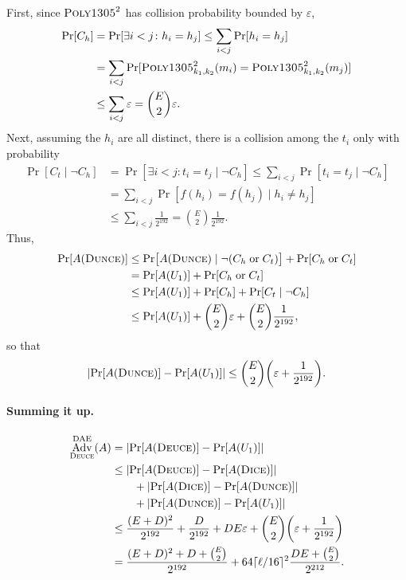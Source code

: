 \documentclass{article}
\def\operatorsc#1{{%
  \ifmmode\let\next=\operatorname\else\let\next=\relax\fi\next{\textsc{#1}}}}
\def\Poly#1/{\operatorsc{Poly#1}}
\def\DUNCE/{\operatorsc{Dunce}}
\def\DEUCE/{\operatorsc{Deuce}}
\def\DICE/{\operatorsc{Dice}}
\def\DAE{%
  \ifmmode\def\next{\operatorname{DAE}}%
    \else\def\next/{\textsc{dae}}%
  \fi\next}
\DeclareMathOperator{\Adv}{Adv}
\newcommand{\given}{\mathrel|}
\newcommand{\collisionbound}{\varepsilon}
\begin{document}
First, since $\Poly1305/^2$ has collision probability bounded by
 $\collisionbound$,
%
\begin{align*}
  \Pr[C_h]
    &= \Pr[\exists i<j\colon h_i = h_j]
     \leq \sum_{i<j} \Pr[h_i = h_j] \\
    &= \sum_{i<j}
         \Pr[\Poly1305/^2_{k_1,k_2}(m_i) = \Poly1305/^2_{k_1,k_2}(m_j)] \\
    &\leq \sum_{i<j} \collisionbound
     = \binom{E}{2} \collisionbound.
\end{align*}
%
Next, assuming the $h_i$ are all distinct, there is a collision among
 the $t_i$ only with probability
%
\begin{align*}
  \Pr[C_t \given \lnot C_h]
    &= \Pr[\exists i<j\colon t_i = t_j \given \lnot C_h]
     \leq \sum_{i<j} \Pr[t_i = t_j \given \lnot C_h] \\
    &= \sum_{i<j} \Pr[f(h_i) = f(h_j) \given h_i \ne h_j] \\
    &\leq \sum_{i<j} \frac{1}{2^{192}}
     = \binom{E}{2} \frac{1}{2^{192}}.
\end{align*}
%
Thus,
%
\begin{align*}
  \Pr[A(\DUNCE/)]
  &\leq \Pr\bigl[A(\DUNCE/) \given
            \lnot (C_h \mathrel{\text{or}} C_t)\bigr]
        + \Pr[C_h \mathrel{\text{or}} C_t] \\
  &= \Pr[A(U_1)] + \Pr[C_h \mathrel{\text{or}} C_t] \\
  &\leq \Pr[A(U_1)] + \Pr[C_h] + \Pr[C_t \given \lnot C_h] \\
  &\leq \Pr[A(U_1)] + \binom{E}{2} \collisionbound
        + \binom{E}{2} \frac{1}{2^{192}},
\end{align*}
%
 so that
\[
  \lvert\Pr[A(\DUNCE/)] - \Pr[A(U_1)]\rvert
  \leq \binom{E}{2} \biggl(\collisionbound + \frac{1}{2^{192}}\biggr).
\]

\paragraph*{Summing it up.}

\begin{align*}
  \Adv^{\DAE}_{\DEUCE/}(A)
  &= \lvert\Pr[A(\DEUCE/)] - \Pr[A(U_1)]\rvert \\
  &\leq \lvert\Pr[A(\DEUCE/)] - \Pr[A(\DICE/)]\rvert \\
  &\qquad + \lvert\Pr[A(\DICE/)] - \Pr[A(\DUNCE/)]\rvert \\
  &\qquad + \lvert\Pr[A(\DUNCE/)] - \Pr[A(U_1)]\rvert \\
  &\leq \frac{(E + D)^2}{2^{192}}
          + \frac{D}{2^{192}} + D E \collisionbound
          + \binom{E}{2} \biggl(\collisionbound + \frac{1}{2^{192}}\biggr) \\
  &= \frac{(E + D)^2 + D + \binom{E}{2}}{2^{192}}
     + 64\lceil\ell/16\rceil^2 \frac{D E + \binom{E}{2}}{2^{212}}.
\end{align*}

\end{document}

